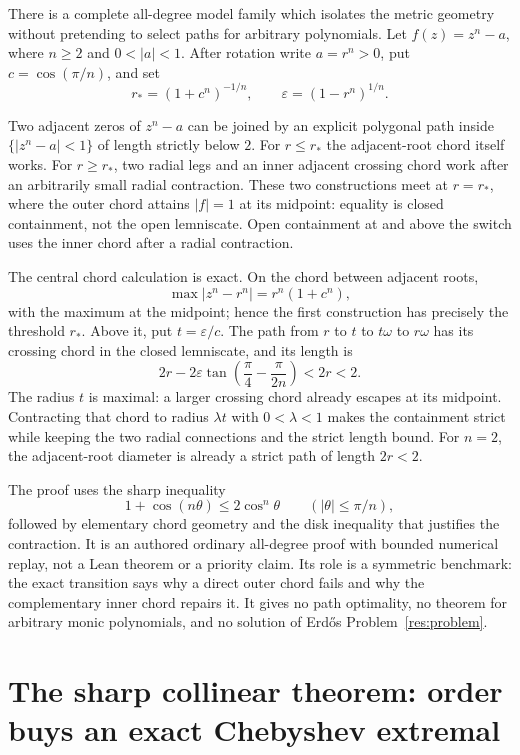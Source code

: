 \documentclass[11pt]{article}
\begin{document}
There is a complete all-degree model family which isolates the metric geometry
without pretending to select paths for arbitrary polynomials.  Let
$f(z)=z^n-a$, where $n\ge2$ and $0<|a|<1$.  After rotation write $a=r^n>0$,
put $c=\cos(\pi/n)$, and set
\[
 r_*=(1+c^n)^{-1/n},\qquad
 \varepsilon=(1-r^n)^{1/n}.
\]

\begin{theorem}
Two adjacent zeros of $z^n-a$ can be joined by an explicit polygonal path
inside $\{|z^n-a|<1\}$ of length strictly below $2$.  For $r\le r_*$ the
adjacent-root chord itself works.  For $r\ge r_*$, two radial legs and an
inner adjacent crossing chord work after an arbitrarily small radial
contraction.  These two constructions meet at $r=r_*$, where the outer chord attains
$|f|=1$ at its midpoint: equality is closed containment, not the open
lemniscate.  Open containment at and above the switch uses the inner chord
after a radial contraction.
\end{theorem}

The central chord calculation is exact.  On the chord between adjacent roots,
\[
 \max |z^n-r^n|=r^n(1+c^n),
\]
with the maximum at the midpoint; hence the first construction has precisely
the threshold $r_*$.  Above it, put $t=\varepsilon/c$.  The path from $r$ to
$t$ to $t\omega$ to $r\omega$ has its crossing chord in the closed
lemniscate, and its length is
\[
 2r-2\varepsilon\tan\!\left(\frac\pi4-\frac\pi{2n}\right)<2r<2.
\]
The radius $t$ is maximal: a larger crossing chord already escapes at its
midpoint.  Contracting that chord to radius $\lambda t$ with $0<\lambda<1$
makes the containment strict while keeping the two radial connections and the
strict length bound.  For $n=2$, the adjacent-root diameter is already a
strict path of length $2r<2$.

The proof uses the sharp inequality
\[
  1+\cos(n\theta)\le2\cos^n\theta
  \qquad (|\theta|\le\pi/n),
\]
followed by elementary chord geometry and the disk inequality that justifies
the contraction.  It is an authored ordinary all-degree proof with bounded
numerical replay, not a Lean theorem or a priority claim.  Its role is a
symmetric benchmark: the exact transition says why a direct outer chord fails
and why the complementary inner chord repairs it.  It gives no path
optimality, no theorem for arbitrary monic polynomials, and no solution of
Erd\H{o}s Problem~\ref{res:problem}.

\section{The sharp collinear theorem: order buys an exact Chebyshev extremal}
\label{sec:collinear}
\end{document}
